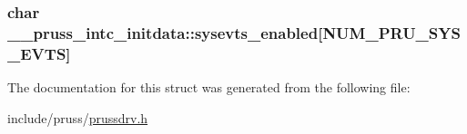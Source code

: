 \hypertarget{struct____pruss__intc__initdata_aa2c01e019376c32180ce166302f69ee6}{
\subsubsection[{sysevts\-\_\-enabled}]{\setlength{\rightskip}{0pt plus 5cm}char \-\_\-\-\_\-pruss\-\_\-intc\-\_\-initdata\-::sysevts\-\_\-enabled\mbox{[}{\bf N\-U\-M\-\_\-\-P\-R\-U\-\_\-\-S\-Y\-S\-\_\-\-E\-V\-T\-S}\mbox{]}}}\label{struct____pruss__intc__initdata_aa2c01e019376c32180ce166302f69ee6}


The documentation for this struct was generated from the following file\-:\begin{DoxyCompactItemize}
\item 
include/pruss/\hyperlink{prussdrv_8h}{prussdrv.\-h}\end{DoxyCompactItemize}
